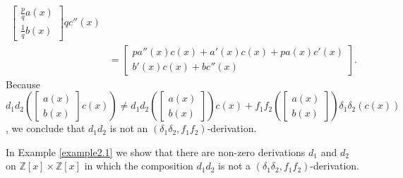 \documentclass{arxiv}
\begin{document}
\begin{example}
\begin{align*}
\begin{bmatrix}
        \frac{p}{q} a(x)\\
        \frac{1}{q} b(x)
    \end{bmatrix} qc''(x)\\
    &= \begin{bmatrix}
        pa''(x)c(x)+a'(x)c(x)+pa(x)c'(x)\\
        b'(x)c(x) + bc''(x)
    \end{bmatrix}.
    \end{align*}
    Because $d_1d_2 \left( \begin{bmatrix}
        a(x)\\
        b(x)
    \end{bmatrix} c(x) \right) \ne d_1d_2 \left(\begin{bmatrix}
        a(x)\\
        b(x)
    \end{bmatrix}\right) c(x) + f_1f_2 \left(\begin{bmatrix}
        a(x)\\
        b(x)
    \end{bmatrix} \right) \delta_1\delta_2(c(x))$, we conclude that $d_1d_2$ is not an $(\delta_1\delta_2,f_1f_2)$-derivation.
\end{example}
In Example \ref{example2.1} we show that there are non-zero derivations $d_1$ and $ d_2$ on $\mathbb{Z}[x] \times \mathbb{Z}[x]$ in which the composition $d_1d_2$ is not a $(\delta_1\delta_2,f_1f_2)$-derivation.
\end{document}
